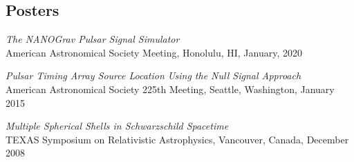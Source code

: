 \documentclass[11pt,letterpaper,sans,unicode]{moderncv}
\newcommand{\talkitem}[3]{\item \textit{#1}\\{#2}, #3} %
\begin{document}
\subsection{Posters}
\begin{etaremune}[leftmargin=8mm]
\small
\talkitem{The NANOGrav Pulsar Signal Simulator}{American Astronomical Society Meeting}{Honolulu, HI, January, 2020}
\talkitem{Pulsar Timing Array Source Location Using the Null Signal Approach}{American Astronomical Society 225th Meeting}{Seattle, Washington, January 2015}
\talkitem{Multiple Spherical Shells in Schwarzschild Spacetime}{TEXAS Symposium on Relativistic Astrophysics}{Vancouver, Canada, December 2008}
\end{etaremune}

\begin{comment}
\newpage
\section{References}



\end{comment}
\end{document}
